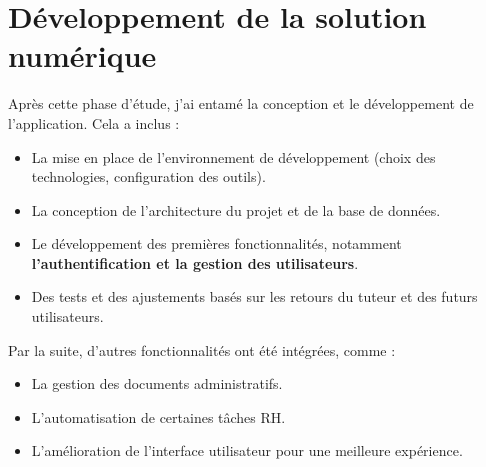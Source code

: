 \section{Développement de la solution numérique}
Après cette phase d’étude, j’ai entamé la conception et le développement de l’application. Cela a inclus :
\begin{itemize}
    \item La mise en place de l’environnement de développement (choix des technologies, configuration des outils).
    \item La conception de l’architecture du projet et de la base de données.
    \item Le développement des premières fonctionnalités, notamment \textbf{ l’authentification et la gestion des utilisateurs}.
    \item Des tests et des ajustements basés sur les retours du tuteur et des futurs utilisateurs.

\end{itemize}
Par la suite, d’autres fonctionnalités ont été intégrées, comme :

\begin{itemize}
    \item La gestion des documents administratifs.
    \item L’automatisation de certaines tâches RH.
    \item L’amélioration de l’interface utilisateur pour une meilleure expérience.
\end{itemize}


